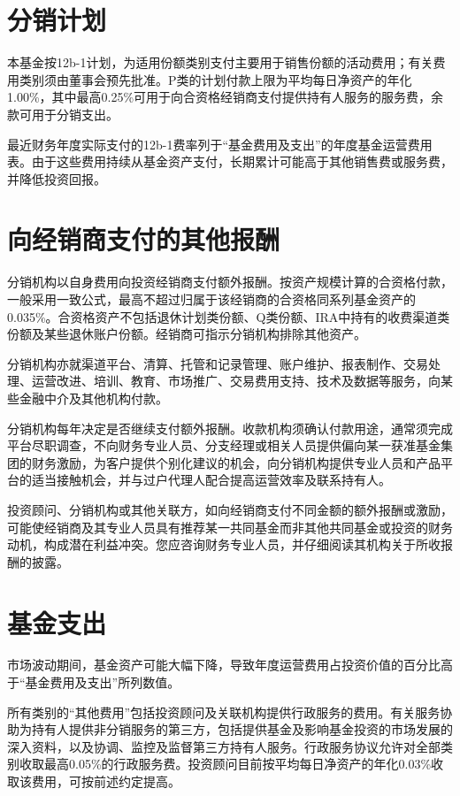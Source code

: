 \documentclass[UTF8,fontset=none,11pt,a4paper]{ctexart}
\begin{document}
\section*{分销计划}
本基金按12b-1计划，为适用份额类别支付主要用于销售份额的活动费用；有关费用类别须由董事会预先批准。P类的计划付款上限为平均每日净资产的年化1.00\%，其中最高0.25\%可用于向合资格经销商支付提供持有人服务的服务费，余款可用于\allowbreak\mbox{分销支出。}


最近财务年度实际支付的12b-1费率列于“基金费用及支出”的年度基金运营费用表。由于这些费用持续从基金资产支付，长期累计可能高于其他销售费或服务费，并降低\allowbreak\mbox{投资回报。}


\section*{向经销商支付的其他报酬}
分销机构以自身费用向投资经销商支付额外报酬。按资产规模计算的合资格付款，一般采用一致公式，最高不超过归属于该经销商的合资格同系列基金资产的0.035\%。合资格资产不包括退休计划类份额、Q类份额、IRA中持有的收费渠道类份额及某些退休账户份额。经销商可指示分销机构排除\allowbreak\mbox{其他资产。}


分销机构亦就渠道平台、清算、托管和记录管理、账户维护、报表制作、交易处理、运营改进、培训、教育、市场推广、交易费用支持、技术及数据等服务，向某些金融中介及其他\allowbreak\mbox{机构付款。}


分销机构每年决定是否继续支付额外报酬。收款机构须确认付款用途，通常须完成平台尽职调查，不向财务专业人员、分支经理或相关人员提供偏向某一获准基金集团的财务激励，为客户提供个别化建议的机会，向分销机构提供专业人员和产品平台的适当接触机会，并与过户代理人配合提高运营效率及联\allowbreak\mbox{系持有人。}


投资顾问、分销机构或其他关联方，如向经销商支付不同金额的额外报酬或激励，可能使经销商及其专业人员具有推荐某一共同基金而非其他共同基金或投资的财务动机，构成潜在利益冲突。您应咨询财务专业人员，并仔细阅读其机构关于所收报\allowbreak\mbox{酬的披露。}


\section*{基金支出}
市场波动期间，基金资产可能大幅下降，导致年度运营费用占投资价值的百分比高于“基金费用及支出”\allowbreak\mbox{所列数值。}


所有类别的“其他费用”包括投资顾问及关联机构提供行政服务的费用。有关服务协助为持有人提供非分销服务的第三方，包括提供基金及影响基金投资的市场发展的深入资料，以及协调、监控及监督第三方持有人服务。行政服务协议允许对全部类别收取最高0.05\%的行政服务费。投资顾问目前按平均每日净资产的年化0.03\%收取该费用，可按前述\allowbreak\mbox{约定提高。}
\end{document}
